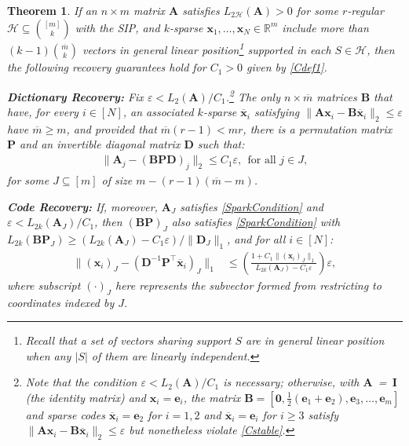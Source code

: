 \documentclass[journal, twocolumn]{IEEEtran}
\newtheorem{theorem}{Theorem}
\begin{document}
\begin{theorem}\label{DeterministicUniquenessTheorem}
If an $n \times m$ matrix $\mathbf{A}$ satisfies $L_{2\mathcal{H}}(\mathbf{A}) > 0$ for some $r$-regular $\mathcal{H} \subseteq {[m] \choose k}$ with the SIP, and $k$-sparse \mbox{$\mathbf{x}_1, \ldots, \mathbf{x}_N \in \mathbb{R}^m$} include more than $(k-1){\overline m \choose k}$ vectors in general linear position\footnote{Recall that a set of vectors sharing support $S$ are in \emph{general linear position} when any $|S|$ of them are linearly independent.} supported in each $S \in \mathcal{H}$, then the following recovery guarantees hold for $C_1 > 0$ given by \eqref{Cdef1}.

\textbf{Dictionary Recovery:} Fix $\varepsilon < L_{2}(\mathbf{A}) / C_1$.\footnote{Note that the condition $\varepsilon < L_2(\mathbf{A}) /C_1$ is necessary; otherwise, with \mbox{$\mathbf{A}$ = $\mathbf{I}$} (the identity matrix) and $\mathbf{x}_i = \mathbf{e}_i$, the matrix $\mathbf{B} = \left[\mathbf{0}, \frac{1}{2}(\mathbf{e}_1 + \mathbf{e}_2), \mathbf{e}_3, \ldots, \mathbf{e}_{m} \right]$ and sparse codes $\mathbf{\overline x}_i = \mathbf{e}_2$ for $i = 1, 2$ and $\mathbf{\overline x}_i = \mathbf{e}_i$ for $i \geq 3$ satisfy $\|\mathbf{A}\mathbf{x}_i - \mathbf{B}\mathbf{\overline{x}}_i \|_2 \leq \varepsilon$ but nonetheless violate \eqref{Cstable}.} The only $n \times \overline m$ matrices $\mathbf{B}$ that have, for every $i \in [N]$, an associated $k$-sparse $\mathbf{\overline x}_i$ satisfying \mbox{$\|\mathbf{A}\mathbf{x}_i - \mathbf{B}\mathbf{\overline x}_i\|_2 \leq \varepsilon$} have $\overline m \geq m$, and provided that $\overline m (r-1) < mr$, there is a permutation matrix $\mathbf{P}$ and an invertible diagonal matrix $\mathbf{D}$ such that:
\begin{align}\label{Cstable}
\|\mathbf{A}_j- (\mathbf{BPD})_j\|_2 \leq C_1 \varepsilon, \ \ \text{for all } j \in J,
\end{align}
%
for some $J \subseteq [m]$ of size \mbox{$m - (r-1)(\overline m - m)$}. 

\textbf{Code Recovery:} If, moreover, $\mathbf{A}_J$ satisfies \eqref{SparkCondition} and $\varepsilon < L_{2k}(\mathbf{A}_J) / C_1$, then $(\mathbf{BP})_J$ also satisfies \eqref{SparkCondition} with $L_{2k}(\mathbf{BP}_J) \geq (L_{2k}(\mathbf{A}_J) - C_1 \varepsilon) / \|\mathbf{D}_J\|_1$, and for all $i \in [N]$:
\begin{align}\label{b-PDa}
\|(\mathbf{x}_i)_J - (\mathbf{D}^{-1}\mathbf{P}^{\top} \mathbf{\overline x}_i)_J\|_1 &\leq  \left( \frac{ 1+C_1 \|(\mathbf{x}_i)_J\|_1 }{ L_{2k}(\mathbf{A}_J) -  C_1\varepsilon } \right) \varepsilon,
\end{align}
%
where subscript $(\cdot)_J$ here represents the subvector formed from restricting to coordinates indexed by $J$.
\end{theorem}
\end{document}
